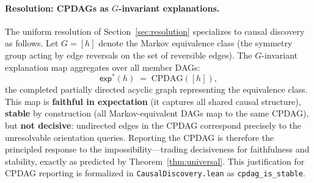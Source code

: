 \paragraph{Resolution: CPDAGs as $G$-invariant explanations.}
The uniform resolution of Section~\ref{sec:resolution} specializes to causal
discovery as follows.  Let $G = [h]$ denote the Markov equivalence class
(the symmetry group acting by edge reversals on the set of reversible edges).
The $G$-invariant explanation map aggregates over all member DAGs:
\[
  \mathsf{exp}^*(h)
  \;=\;
  \mathrm{CPDAG}([h]),
\]
the completed partially directed acyclic graph representing the equivalence
class.  This map is \textbf{faithful in expectation} (it captures all shared
causal structure), \textbf{stable} by construction (all Markov-equivalent
DAGs map to the same CPDAG), but \textbf{not decisive}: undirected edges in
the CPDAG correspond precisely to the unresolvable orientation queries.
Reporting the CPDAG is therefore the principled response to the
impossibility---trading decisiveness for faithfulness and stability, exactly
as predicted by Theorem~\ref{thm:universal}.  This justification for CPDAG
reporting is formalized in \texttt{CausalDiscovery.lean} as
\texttt{cpdag\_is\_stable}.
